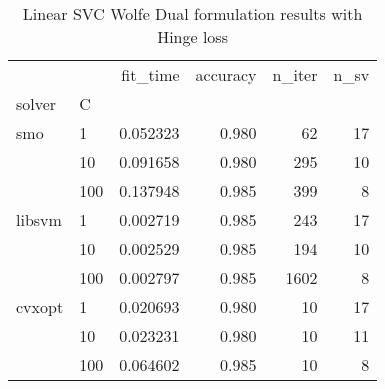 \begin{table}[H]
\centering
\caption{Linear SVC Wolfe Dual formulation results with Hinge loss}
\label{linear_dual_svc_cv_results}
\begin{tabular}{llrrrr}
\toprule
       &     &  fit\_time &  accuracy &  n\_iter &  n\_sv \\
solver & C &           &           &         &       \\
\midrule
smo & 1   &  0.052323 &     0.980 &      62 &    17 \\
       & 10  &  0.091658 &     0.980 &     295 &    10 \\
       & 100 &  0.137948 &     0.985 &     399 &     8 \\
libsvm & 1   &  0.002719 &     0.985 &     243 &    17 \\
       & 10  &  0.002529 &     0.985 &     194 &    10 \\
       & 100 &  0.002797 &     0.985 &    1602 &     8 \\
cvxopt & 1   &  0.020693 &     0.980 &      10 &    17 \\
       & 10  &  0.023231 &     0.980 &      10 &    11 \\
       & 100 &  0.064602 &     0.985 &      10 &     8 \\
\bottomrule
\end{tabular}
\end{table}
